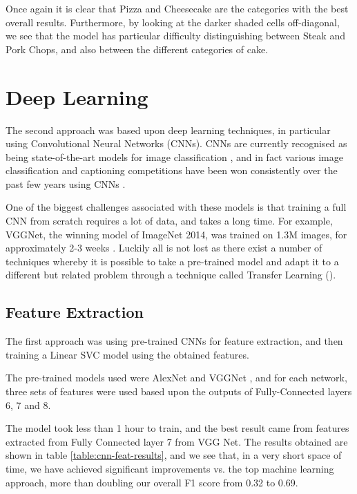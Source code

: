 \documentclass[10pt,a4paper]{article}
\begin{document}
Once again it is clear that Pizza and Cheesecake are the categories with the best overall results. Furthermore,  by looking at the darker shaded cells off-diagonal, we see that the model has particular difficulty distinguishing between Steak and Pork Chops, and also between the different categories of cake.

\section{Deep Learning}

The second approach was based upon deep learning techniques, in particular using Convolutional Neural Networks (CNNs). CNNs are currently recognised as being state-of-the-art models for image classification \cite{vgg}, and in fact various image classification and captioning competitions have been won consistently over the past few years using CNNs \cite{msra}.

One of the biggest challenges associated with these models is that training a full CNN from scratch requires a lot of data, and takes a long time. For example, VGGNet, the winning model of ImageNet 2014, was trained on 1.3M images, for approximately 2-3 weeks \cite{vgg}.
Luckily all is not lost as there exist a number of techniques whereby it is possible to take a pre-trained model and adapt it to a different but related problem through a technique called Transfer Learning (\cite{transfer-learning}).

\subsection*{Feature Extraction}

The first approach was using pre-trained CNNs for feature extraction, and then training a Linear SVC model using the obtained features.

The pre-trained models used were AlexNet \cite{alexnet} and VGGNet \cite{vggnet}, and for each network, three sets of features were used based upon the outputs of Fully-Connected layers 6, 7 and 8.

The model took less than 1 hour to train, and the best result came from features extracted from Fully Connected layer 7 from VGG Net. The results obtained are shown in table \ref{table:cnn-feat-results}, and we see that, in a very short space of time, we have achieved significant improvements vs. the top machine learning approach, more than doubling our overall F1 score from 0.32 to 0.69.
\end{document}
